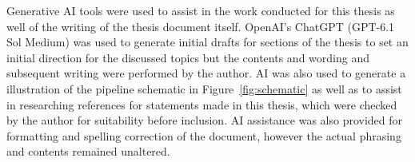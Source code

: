 \documentclass[final,twoside]{vutinfth}
\begin{document}

\setcounter{tocdepth}{3}
\setcounter{secnumdepth}{3}
\tableofcontents* %

\mainmatter











\backmatter

\begin{aitools}
Generative AI tools were used to assist in the work conducted for this thesis as well of the writing of the thesis document itself. OpenAI's ChatGPT (GPT-6.1 Sol Medium) was used to generate initial drafts for sections of the thesis to set an initial direction for the discussed topics but the contents and wording and subsequent writing were performed by the author. AI was also used to generate a illustration of the pipeline schematic in Figure~\ref{fig:schematic} as well as to assist in researching references for statements made in this thesis, which were checked by the author for suitability before inclusion. AI assistance was also provided for formatting and spelling correction of the document, however the actual phrasing and contents remained unaltered. 
\end{aitools}

\listoffigures %

\cleardoublepage %
\listoftables %


\printindex %

{}
\printglossaries %


\end{document}
